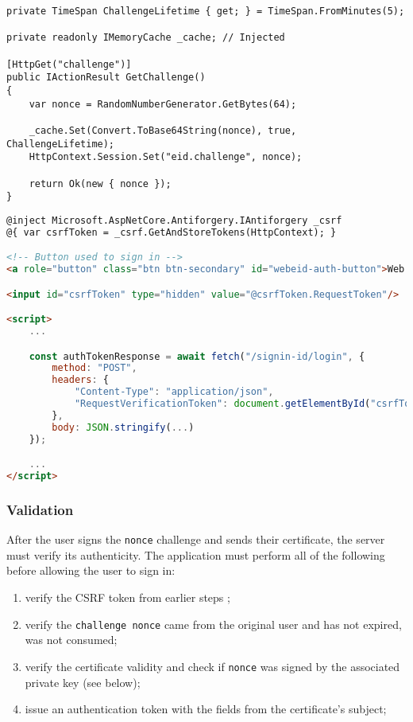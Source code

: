 \begin{lstlisting}[caption={Web eID Challenge Endpoint}, label={lst:web-eid-challenge}]
private TimeSpan ChallengeLifetime { get; } = TimeSpan.FromMinutes(5);

private readonly IMemoryCache _cache; // Injected

[HttpGet("challenge")]
public IActionResult GetChallenge()
{
    var nonce = RandomNumberGenerator.GetBytes(64);

    _cache.Set(Convert.ToBase64String(nonce), true, ChallengeLifetime);
    HttpContext.Session.Set("eid.challenge", nonce);

    return Ok(new { nonce });
}
\end{lstlisting}


\begin{lstlisting}[caption={Web eID UI excerpt}, label={lst:web-eid-challenge-ui}, language={html}]
@inject Microsoft.AspNetCore.Antiforgery.IAntiforgery _csrf
@{ var csrfToken = _csrf.GetAndStoreTokens(HttpContext); }

<!-- Button used to sign in -->
<a role="button" class="btn btn-secondary" id="webeid-auth-button">Web eID</a>

<input id="csrfToken" type="hidden" value="@csrfToken.RequestToken"/>

<script>
    ...

    const authTokenResponse = await fetch("/signin-id/login", {
        method: "POST",
        headers: {
            "Content-Type": "application/json",
            "RequestVerificationToken": document.getElementById("csrfToken").value
        },
        body: JSON.stringify(...)
    });

    ...
</script>
\end{lstlisting}

\subsubsection{Validation}

After the user signs the \texttt{nonce} challenge and sends their certificate, the server must verify its authenticity. The application must perform all of the following before allowing the user to sign in:

\begin{enumerate}
  \item verify the CSRF token from earlier steps \cite{ria-webeid-source-web-eid-authtoken-validation-java-readme};
  \item verify the \texttt{challenge nonce} came from the original user and has not expired, was not consumed;
  \item verify the certificate validity and check if \texttt{nonce} was signed by the associated private key (see below);
  \item issue an authentication token with the fields from the certificate's subject;
\end{enumerate}

